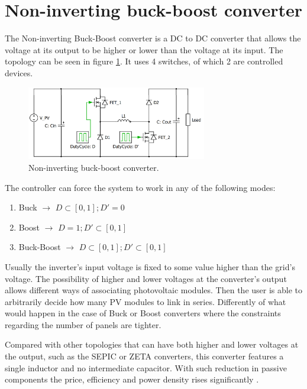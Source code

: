 
\section{Non-inverting buck-boost converter\label{N_INV_BB}}
		
The Non-inverting Buck-Boost converter is a DC to DC converter that allows the voltage at its output to be higher or lower than the voltage at its input. The topology can be seen in figure \ref{N_INV_BB_SCHEMATIC}. It uses 4 switches, of which 2 are controlled devices. 
		

\begin{figure}[htbp]
	\begin{center}
	\includegraphics[width=0.7\textwidth]{../Pictures/2_d_H_B_BB}
	\caption{Non-inverting buck-boost converter.}
	\label{N_INV_BB_SCHEMATIC}
	\end{center}	
\end{figure}

		
The controller can force the system to work in any of the following modes:

\begin{enumerate}
	\item Buck $\rightarrow$ $ D \subset [0,1];	 D' = 0 $
	\item Boost $\rightarrow$ $ D = 1;	 D' \subset [0,1] $
	\item Buck-Boost $\rightarrow$ $ D \subset [0,1]; D' \subset [0,1] $
\end{enumerate}
		
Usually the inverter's input voltage is fixed to some value higher than the grid's voltage. The possibility of higher and lower voltages at the converter's output allows different ways of associating photovoltaic modules. Then the user is able to arbitrarily decide how many PV modules to link in series. Differently of what would happen in the case of Buck or Boost converters where the constraints regarding the number of panels are tighter.
		
Compared with other topologies that can have both higher and lower voltages at the output, such as the SEPIC or ZETA converters, this converter features a single inductor and no intermediate capacitor. With such reduction in passive components the price, efficiency and power density rises significantly \cite{underthehood}.

